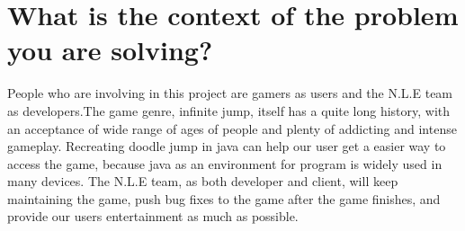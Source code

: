 \documentclass[11pt, oneside]{article}
\begin{document}
\section{What is the context of the problem you are solving?}
People who are involving in this project are gamers as users and the N.L.E team as developers.The game genre, infinite jump, itself has a quite long history, with an acceptance of wide range of ages of people and plenty of addicting and intense gameplay. Recreating doodle jump in java can help our user get a easier way to access the game, because java as an environment for program is widely used in many devices. The N.L.E team, as both developer and client, will keep maintaining the game, push bug fixes to the game after the game finishes, and provide our users entertainment as much as possible.
\end{document}
